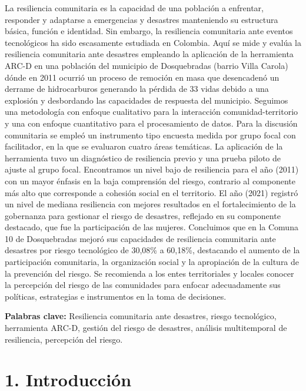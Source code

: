 \documentclass[
  letterpaper,
]{book}
\begin{document}
La resiliencia comunitaria es la capacidad de una población a enfrentar,
responder y adaptarse a emergencias y desastres manteniendo su
estructura básica, función e identidad. Sin embargo, la resiliencia
comunitaria ante eventos tecnológicos ha sido escasamente estudiada en
Colombia. Aquí se mide y evalúa la resiliencia comunitaria ante
desastres empleando la aplicación de la herramienta ARC-D en una
población del municipio de Dosquebradas (barrio Villa Carola) dónde en
2011 ocurrió un proceso de remoción en masa que desencadenó un derrame
de hidrocarburos generando la pérdida de 33 vidas debido a una explosión
y desbordando las capacidades de respuesta del municipio. Seguimos una
metodología con enfoque cualitativo para la interacción
comunidad-territorio y una con enfoque cuantitativo para el
procesamiento de datos. Para la discusión comunitaria se empleó un
instrumento tipo encuesta medida por grupo focal con facilitador, en la
que se evaluaron cuatro áreas temáticas. La aplicación de la herramienta
tuvo un diagnóstico de resiliencia previo y una prueba piloto de ajuste
al grupo focal. Encontramos un nivel bajo de resiliencia para el año
(2011) con un mayor énfasis en la baja comprensión del riesgo, contrario
al componente más alto que corresponde a cohesión social en el
territorio. El año (2021) registró un nivel de mediana resiliencia con
mejores resultados en el fortalecimiento de la gobernanza para gestionar
el riesgo de desastres, reflejado en su componente destacado, que fue la
participación de las mujeres. Concluimos que en la Comuna 10 de
Dosquebradas mejoró sus capacidades de resiliencia comunitaria ante
desastres por riesgo tecnológico de 30,08\% a 60,18\%, destacando el
aumento de la participación comunitaria, la organización social y la
apropiación de la cultura de la prevención del riesgo. Se recomienda a
los entes territoriales y locales conocer la percepción del riesgo de
las comunidades para enfocar adecuadamente sus políticas, estrategias e
instrumentos en la toma de decisiones.

\textbf{Palabras clave:} Resiliencia comunitaria ante desastres, riesgo
tecnológico, herramienta ARC-D, gestión del riesgo de desastres,
análisis multitemporal de resiliencia, percepción del riesgo.


\chapter{1. Introducción}\label{introducciuxf3n}
\end{document}
